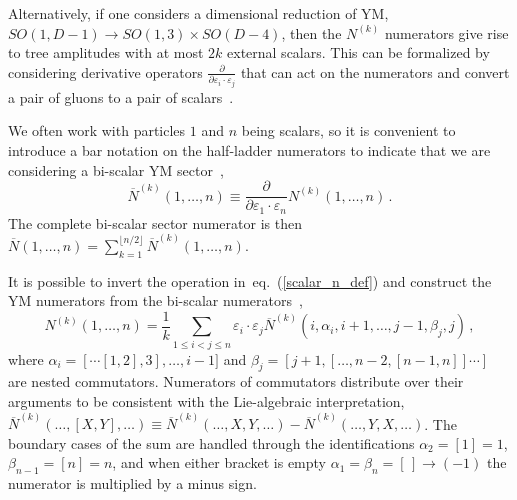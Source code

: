 \documentclass[11pt,a4paper]{article}
\def\eqn#1{eq.~(\ref{#1})}
\begin{document}
Alternatively, if one considers a dimensional reduction of YM, $SO(1,D{-}1)\rightarrow SO(1,3) \times SO(D{-}4)$, then the $N^{(k)}$ numerators give rise to tree amplitudes with at most $2k$ external scalars. This can be formalized by considering derivative operators $\frac{\partial}{\partial\varepsilon_i{\cdot}\varepsilon_j}$ that can act on the numerators and convert a pair of gluons to a pair of scalars~\cite{Cheung:2017yef,Cheung:2017ems}. 

We often work with particles $1$ and $n$ being scalars, so it is convenient to introduce a bar notation on the half-ladder numerators to indicate that we are considering a bi-scalar YM sector~\cite{Chen:2019ywi},
\begin{equation}\label{scalar_n_def}
\overline{N}^{(k)}(1,\ldots, n) \equiv \frac{\partial}{\partial \varepsilon_{1}{\cdot} \varepsilon_{n}}
N^{(k)} (1,\ldots, n) \, .
\end{equation}
The complete bi-scalar sector numerator is then ${\overline N}(1,\ldots, n) = \sum_{k=1}^{\lfloor n/2 \rfloor} {\overline N}^{(k)}(1,\ldots, n)$.

It is possible to invert the operation in~\eqn{scalar_n_def} and construct the YM numerators from the bi-scalar numerators~\cite{Chen:2019ywi},
\begin{equation}
\label{ym_n_from_scalar}
N^{(k)} (1,\ldots, n) = \frac{1}{k} \sum_{1\le i< j \le n} \varepsilon_{i}{\cdot} \varepsilon_{j} \overline{N}^{(k)} (i,\alpha_i, i+1, \ldots, j-1, \beta_j, j)\,,
\end{equation}
where $\alpha_i= [\cdots[1,2],3],\ldots,i-1]$ and  $\beta_j= [j+1,[\ldots,n-2,[n-1,n]]\cdots]$ are nested commutators. 
Numerators of commutators distribute over their arguments to be consistent with the Lie-algebraic interpretation, $\overline{N}^{(k)} (\ldots,[X,Y],\ldots) \equiv \overline{N}^{(k)} (\ldots,X,Y,\ldots)-\overline{N}^{(k)} (\ldots,Y,X,\ldots)$. The boundary cases of the sum are handled through the identifications $\alpha_2=[1]=1$, $\beta_{n-1}=[n]=n$, and when either bracket is empty $\alpha_1=\beta_{n}=[\,]\rightarrow (-1)$ the numerator is multiplied by a minus sign. 
\end{document}
